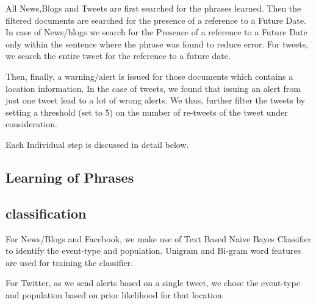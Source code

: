 All News,Blogs and Tweets are first searched for the phrases learned. Then the filtered documents are searched for the presence of a reference to a Future Date. In case of News/blogs we search for the Presence of a reference to a Future Date only within the sentence where the phrase was found to reduce error. For tweets, we search the entire tweet for the reference to a future date.

Then, finally, a warning/alert is issued for those documents which contains a location information. In the case of tweets, we found that issuing an alert from just one tweet lead to a lot of wrong alerts. We thus, further filter the tweets by setting a threshold (set to 5) on the number of re-tweets of the tweet under consideration.

Each Individual step is discussed in detail below.

\subsection{Learning of Phrases}



\subsection{classification}
For News/Blogs and Facebook, we make use of Text Based Naive Bayes Classifier to identify the event-type and population. Unigram and Bi-gram word features are used for training the classifier.

For Twitter, as we send alerts based on a single tweet, we chose the event-type and population based on prior likelihood for that location.

